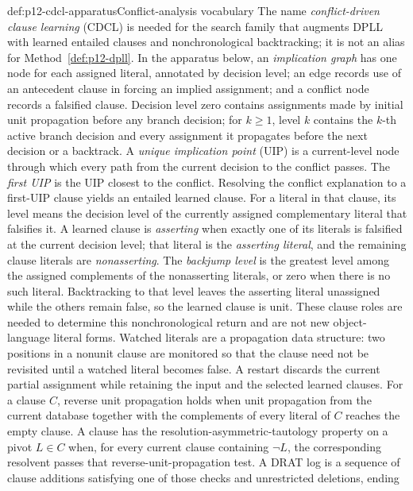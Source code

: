 \begin{hbdefinition}{def:p12-cdcl-apparatus}{Conflict-analysis vocabulary}
The name \emph{conflict-driven clause learning} (CDCL) is needed for the search
family that augments DPLL with learned entailed clauses and nonchronological
backtracking; it is not an alias for Method~\ref{def:p12-dpll}.  In the
apparatus below, an \emph{implication graph} has one node for each assigned
literal, annotated by decision level; an edge records use of an antecedent
clause in forcing an implied assignment; and a conflict node records a
falsified clause.  Decision level zero contains assignments made by initial
unit propagation before any branch decision; for \(k\geq 1\), level \(k\)
contains the \(k\)-th active branch decision and every assignment it propagates
before the next decision or a backtrack.  A \emph{unique implication point}
(UIP) is a current-level
node through which every path from the current decision to the conflict passes.
The \emph{first UIP} is the UIP closest to the conflict.  Resolving the
conflict explanation to a first-UIP clause yields an entailed
learned clause.  For a literal in that clause, its level means the decision
level of the currently assigned complementary literal that falsifies it.  A
learned clause is \emph{asserting} when exactly one of its literals is
falsified at the current decision level; that literal is the
\emph{asserting literal}, and the remaining clause literals are
\emph{nonasserting}.  The \emph{backjump level} is the greatest level among
the assigned complements of the nonasserting literals, or zero when there is
no such literal.  Backtracking to that level leaves the asserting literal
unassigned while the others remain false, so the learned clause is unit.
These clause roles are needed to determine this nonchronological return and
are not new object-language literal forms.  Watched literals are a
propagation data structure: two positions in a nonunit clause are monitored so
that the clause need not be revisited until a watched literal becomes false.
A restart discards the current partial assignment while retaining the input
and the selected learned clauses.  For a clause \(C\), reverse unit propagation
holds when unit propagation from the current database together with the
complements of every literal of \(C\) reaches the empty clause.  A clause has
the resolution-asymmetric-tautology property on a pivot \(L\in C\) when, for
every current clause containing \(\neg L\), the corresponding resolvent passes
that reverse-unit-propagation test.  A DRAT log is a sequence of clause
additions satisfying one of those checks and unrestricted deletions, ending

\end{hbdefinition}
